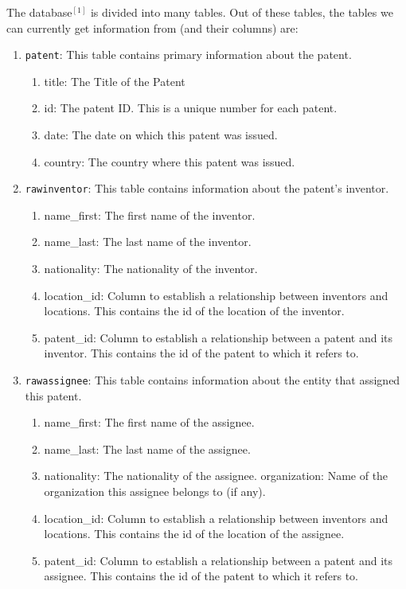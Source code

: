 The database$^{[1]}$ is divided into many tables. Out of these tables, the tables we can currently get information from (and their columns) are:

\begin{enumerate}

\item \verb`patent`: This table contains primary information about the patent. 
\begin{enumerate} 
\item title: The Title of the Patent
\item id: The patent ID. This is a unique number for each patent.
\item date: The date on which this patent was issued. 
\item country: The country where this patent was issued.
\end{enumerate}

\item \verb`rawinventor`: This table contains information about the patent’s inventor.
\begin{enumerate}
\item name\_first: The first name of the inventor.
\item name\_last: The last name of the inventor.
\item nationality: The nationality of the inventor.
\item location\_id: Column to establish a relationship between inventors and locations. This contains the id of the location of the inventor.
\item patent\_id: Column to establish a relationship between a patent and its inventor. This contains the id of the patent to which it refers to.
\end{enumerate}

\item \verb`rawassignee`: This table contains information about the entity that assigned this patent.
\begin{enumerate}
\item name\_first: The first name of the assignee.
\item name\_last: The last name of the assignee.
\item nationality: The nationality of the assignee.
organization: Name of the organization this assignee belongs to (if any).
\item location\_id: Column to establish a relationship between inventors and locations. This contains the id of the location of the assignee.
\item patent\_id: Column to establish a relationship between a patent and its assignee. This contains the id of the patent to which it refers to.
\end{enumerate}


\end{enumerate}
